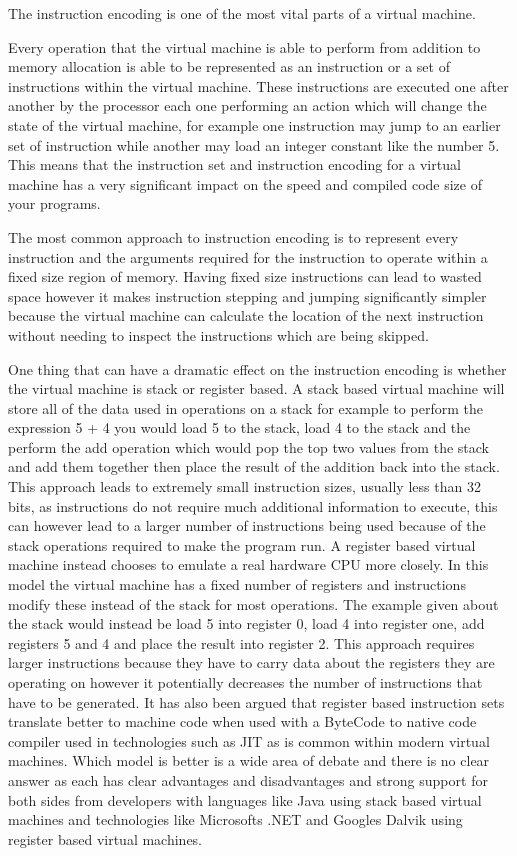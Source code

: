 \documentclass[]{final_report}
\begin{document}
The instruction encoding is one of the most vital parts of a virtual machine.

Every operation that the virtual machine is able to perform from addition to memory allocation is able to be represented as an instruction or a set of instructions within the virtual machine.
These instructions are executed one after another by the processor each one performing an action which will change the state of the virtual machine, for example one instruction may jump to an earlier set of instruction while another may load an integer constant like the number 5.
This means that the instruction set and instruction encoding for a virtual machine has a very significant impact on the speed and compiled code size of your programs.

The most common approach to instruction encoding is to represent every instruction and the arguments required for the instruction to operate within a fixed size region of memory. Having fixed size instructions can lead to wasted space however it makes instruction stepping and jumping significantly simpler because the virtual machine can calculate the location of the next instruction without needing to inspect the instructions which are being skipped.

One thing that can have a dramatic effect on the instruction encoding is whether the virtual machine is stack or register based. A stack based virtual machine will store all of the  data used in operations on a stack for example to perform the expression 5 + 4 you would load 5 to the stack, load 4 to the stack and the perform the add operation which would pop the top two values from the stack and add them together then place the result of the addition back into the stack. This approach leads to extremely small instruction sizes, usually less than 32 bits, as instructions do not require much additional information to execute, this can however lead to a larger number of instructions being used because of the stack operations required to make the program run. A register based virtual machine instead chooses to emulate a real hardware CPU more closely. In this model the virtual machine has a fixed number of registers and instructions modify these instead of the stack for most operations. The example given about the stack would instead be load 5 into register 0, load 4 into register one, add registers 5 and 4 and place the result into register 2. This approach requires larger instructions because they have to carry data about the registers they are operating on however it potentially decreases the number of instructions that have to be generated. It has also been argued that register based instruction sets translate better to machine code when used with a ByteCode to native code compiler used in technologies such as JIT as is common within modern virtual machines. Which model is better is a wide area of debate and there is no clear answer as each has clear advantages and disadvantages and strong support for both sides from developers with languages like Java using stack based virtual machines and technologies like Microsofts .NET and Googles Dalvik using register based virtual machines.
\end{document}
